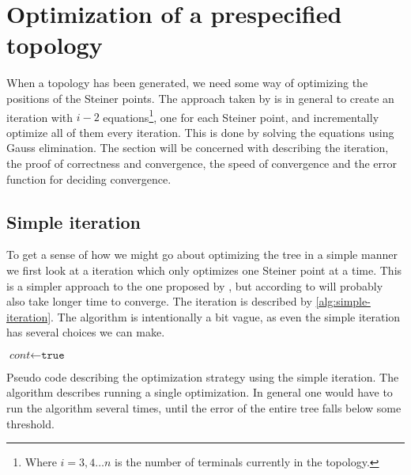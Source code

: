\section{Optimization of a prespecified topology}
\label{sec:optim-presp-topol}

When a topology has been generated, we need some way of optimizing the positions of the
Steiner points. The approach taken by \citeauthor{smith1992} is in general to create an
iteration with $i-2$ equations\footnote{Where $i = 3, 4 \ldots n$ is the number of
terminals currently in the topology.}, one for each Steiner point, and incrementally
optimize all of them every iteration. This is done by solving the equations
using Gauss elimination. The section will be concerned with describing the
iteration, the proof of correctness and convergence, the speed of convergence
and the error function for deciding convergence.

\subsection{Simple iteration}
\label{sec:simple-iteration}

To get a sense of how we might go about optimizing the tree in a simple
manner we first look at a iteration which only optimizes one Steiner point at a
time. This is a simpler approach to the one proposed by \textcite{smith1992},
but according to \citeauthor{smith1992} will probably also take longer time to
converge. The iteration is described by \cref{alg:simple-iteration}. The
algorithm is intentionally a bit vague, as even the simple iteration has several
choices we can make.

\begin{algorithm}[htbp]
  $\textit{cont} \gets \texttt{true}$\;
  \caption[Simple iteration]{Pseudo code describing the optimization strategy
    using the simple iteration. The algorithm describes running a single
    optimization. In general one would have to run the algorithm several times,
    until the error of the entire tree falls below some threshold.\label{alg:simple-iteration}}
\end{algorithm}

